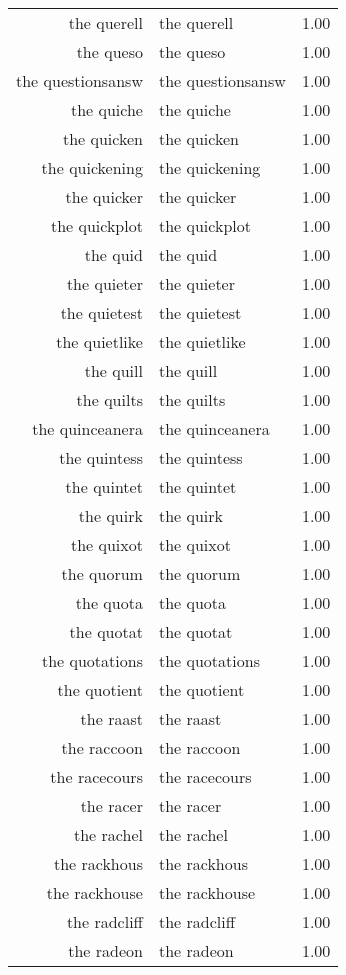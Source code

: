 \begin{table}[ht]
\begin{tabular}{rlr}
  the querell & the querell & 1.00 \\ 
  the queso & the queso & 1.00 \\ 
  the questionsansw & the questionsansw & 1.00 \\ 
  the quiche & the quiche & 1.00 \\ 
  the quicken & the quicken & 1.00 \\ 
  the quickening & the quickening & 1.00 \\ 
  the quicker & the quicker & 1.00 \\ 
  the quickplot & the quickplot & 1.00 \\ 
  the quid & the quid & 1.00 \\ 
  the quieter & the quieter & 1.00 \\ 
  the quietest & the quietest & 1.00 \\ 
  the quietlike & the quietlike & 1.00 \\ 
  the quill & the quill & 1.00 \\ 
  the quilts & the quilts & 1.00 \\ 
  the quinceanera & the quinceanera & 1.00 \\ 
  the quintess & the quintess & 1.00 \\ 
  the quintet & the quintet & 1.00 \\ 
  the quirk & the quirk & 1.00 \\ 
  the quixot & the quixot & 1.00 \\ 
  the quorum & the quorum & 1.00 \\ 
  the quota & the quota & 1.00 \\ 
  the quotat & the quotat & 1.00 \\ 
  the quotations & the quotations & 1.00 \\ 
  the quotient & the quotient & 1.00 \\ 
  the raast & the raast & 1.00 \\ 
  the raccoon & the raccoon & 1.00 \\ 
  the racecours & the racecours & 1.00 \\ 
  the racer & the racer & 1.00 \\ 
  the rachel & the rachel & 1.00 \\ 
  the rackhous & the rackhous & 1.00 \\ 
  the rackhouse & the rackhouse & 1.00 \\ 
  the radcliff & the radcliff & 1.00 \\ 
  the radeon & the radeon & 1.00 \\ 

\end{tabular}
\end{table}
